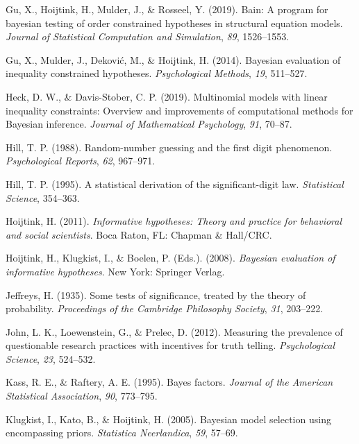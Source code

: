 \documentclass[
  english,
  man,floatsintext]{apa6}
\newlength{\cslhangindent}
\newenvironment{cslreferences}%
  {\setlength{\parindent}{0pt}%
  \everypar{\setlength{\hangindent}{\cslhangindent}}\ignorespaces}%
  {\par}
\begin{document}
\begin{cslreferences}
\leavevmode\hypertarget{ref-gu2019bain}{}%
Gu, X., Hoijtink, H., Mulder, J., \& Rosseel, Y. (2019). Bain: A program for bayesian testing of order constrained hypotheses in structural equation models. \emph{Journal of Statistical Computation and Simulation}, \emph{89}, 1526--1553.

\leavevmode\hypertarget{ref-gu2014bayesian}{}%
Gu, X., Mulder, J., Deković, M., \& Hoijtink, H. (2014). Bayesian evaluation of inequality constrained hypotheses. \emph{Psychological Methods}, \emph{19}, 511--527.

\leavevmode\hypertarget{ref-heck2019multinomial}{}%
Heck, D. W., \& Davis-Stober, C. P. (2019). Multinomial models with linear inequality constraints: Overview and improvements of computational methods for Bayesian inference. \emph{Journal of Mathematical Psychology}, \emph{91}, 70--87.

\leavevmode\hypertarget{ref-hill1988random}{}%
Hill, T. P. (1988). Random-number guessing and the first digit phenomenon. \emph{Psychological Reports}, \emph{62}, 967--971.

\leavevmode\hypertarget{ref-hill1995statistical}{}%
Hill, T. P. (1995). A statistical derivation of the significant-digit law. \emph{Statistical Science}, 354--363.

\leavevmode\hypertarget{ref-hoijtink2011informative}{}%
Hoijtink, H. (2011). \emph{Informative hypotheses: Theory and practice for behavioral and social scientists}. Boca Raton, FL: Chapman \& Hall/CRC.

\leavevmode\hypertarget{ref-hoijtink2008bayesian}{}%
Hoijtink, H., Klugkist, I., \& Boelen, P. (Eds.). (2008). \emph{Bayesian evaluation of informative hypotheses}. New York: Springer Verlag.

\leavevmode\hypertarget{ref-jeffreys1935some}{}%
Jeffreys, H. (1935). Some tests of significance, treated by the theory of probability. \emph{Proceedings of the Cambridge Philosophy Society}, \emph{31}, 203--222.

\leavevmode\hypertarget{ref-john2012measuring}{}%
John, L. K., Loewenstein, G., \& Prelec, D. (2012). Measuring the prevalence of questionable research practices with incentives for truth telling. \emph{Psychological Science}, \emph{23}, 524--532.

\leavevmode\hypertarget{ref-kass1995bayes}{}%
Kass, R. E., \& Raftery, A. E. (1995). Bayes factors. \emph{Journal of the American Statistical Association}, \emph{90}, 773--795.

\leavevmode\hypertarget{ref-klugkist2005bayesian}{}%
Klugkist, I., Kato, B., \& Hoijtink, H. (2005). Bayesian model selection using encompassing priors. \emph{Statistica Neerlandica}, \emph{59}, 57--69.


\end{cslreferences}
\end{document}
